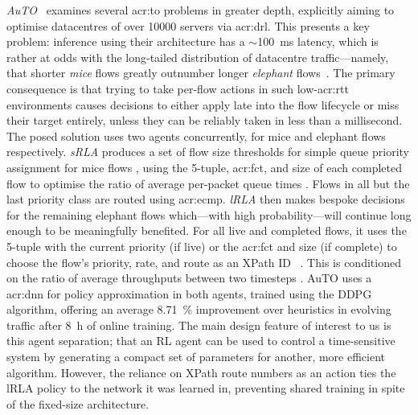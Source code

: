 \emph{AuTO}~\parencite{DBLP:conf/sigcomm/ChenL0L18} examines several \gls{acr:to} problems in greater depth, explicitly aiming to optimise datacentres of over \num{10000} servers via \gls{acr:drl}.
This presents a key problem: inference using their architecture has a $\sim$\qty{100}{\milli\second} latency, which is rather at odds with the long-tailed distribution of datacentre traffic---namely, that shorter \emph{mice} flows greatly outnumber longer \emph{elephant} flows~\parencite{DBLP:journals/ccr/PanBPS03}.
The primary consequence is that trying to take per-flow actions in such low-\gls{acr:rtt} environments causes decisions to either apply late into the flow lifecycle or miss their target entirely, unless they can be reliably taken in less than a millisecond.
The posed solution uses two agents concurrently, for mice and elephant flows respectively.
\emph{sRLA} produces a set of flow size thresholds for simple queue priority assignment for mice flows \prllitactreal, using the 5-tuple, \gls{acr:fct}, and size of each completed flow \prllitstate{} to optimise the ratio of average per-packet queue times \prllitreward.
Flows in all but the last priority class are routed using \gls{acr:ecmp}.
\emph{lRLA} then makes bespoke decisions for the remaining elephant flows which---with high probability---will continue long enough to be meaningfully benefited.
For all live and completed flows, it uses the 5-tuple with the current priority (if live) or the \gls{acr:fct} and size (if complete) \prllitstate{} to choose the flow's priority, rate, and route as an XPath ID~\parencite{DBLP:journals/ton/Hu0W0L0ZG16} \parenglance{$\rllitactraw\times\rllitactrealraw$}.
This is conditioned on the ratio of average throughputs between two timesteps \prllitreward.
AuTO uses a \gls{acr:dnn} for policy approximation in both agents, trained using the DDPG algorithm, offering an average \qty{8.71}{\percent} improvement over heuristics in evolving traffic after \qty{8}{\hour} of online training.
The main design feature of interest to us is this agent separation; that an RL agent can be used to control a time-sensitive system by generating a compact set of parameters for another, more efficient algorithm.
However, the reliance on XPath route numbers as an action ties the lRLA policy to the network it was learned in, preventing shared training in spite of the fixed-size architecture.

